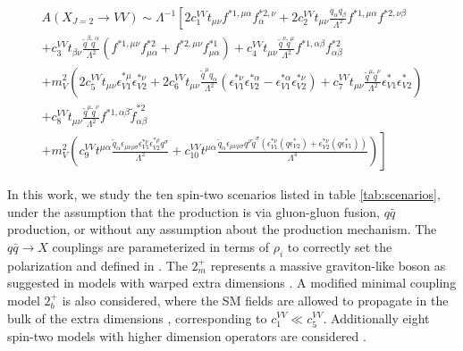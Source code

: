 \begin{multline}
\label{eq:ampl-spin2-a}
A(X_{J=2} \to VV)  \sim \Lambda^{-1} \left [
2 c_{1}^{VV} t_{\mu \nu} f^{*1,\mu \alpha} f^{*2,\nu}_{\alpha}
+ 2 c_{2}^{VV} t_{\mu \nu} \frac{q_\alpha q_\beta }{\Lambda^2} f^{*1,\mu \alpha}  f^{*2,\nu \beta}
\right.   \\
\left.
+ c_{3}^{VV} t_{\beta \nu} \frac{{\tilde q}^\beta {\tilde q}^{\alpha}}{\Lambda^2}
 ( f^{*1,\mu \nu} f^{*2}_{\mu \alpha} + f^{*2,\mu \nu} f^{*1}_{\mu \alpha} )
 + c_{ 4}^{VV}t_{\mu \nu} \frac{{\tilde q}^{\nu} {\tilde q}^\mu}{{\Lambda^2} }  f^{*1,\alpha \beta} f^{*2}_{\alpha \beta}
\right.\\
\left. + m_{V}^2  \left (
2 c_{ 5}^{VV}  t_{\mu\nu} \epsilon_{V1}^{*\mu} \epsilon_{V2}^{*\nu}
+2 c_{ 6}^{VV}  t_{\mu \nu} \frac{{\tilde q}^\mu q_\alpha}{\Lambda^2}
\left ( \epsilon_{V1}^{*\nu} \epsilon_{V2}^{*\alpha} -
\epsilon_{V1}^{*\alpha} \epsilon_{V2}^{*\nu} \right )
+c_{ 7}^{VV} t_{\mu \nu}  \frac{{\tilde q}^\mu {\tilde q}^\nu}{\Lambda^2}  \epsilon^*_{V1} \epsilon^*_{V2}
\right)
\right.  \\
\left.
+c_{ 8}^{VV} t_{\mu \nu} \frac{{\tilde q}^{\mu} {\tilde q}^{\nu}}{\Lambda^2}
  f^{*1,\alpha \beta} {\tilde f}^{*2}_{\alpha \beta}
\right.   \\
 \left.
+  m_{V}^2  \left (
c_{ 9}^{VV} t^{\mu \alpha}
\frac{
{\tilde q}_{\alpha} \epsilon_{\mu \nu \rho \sigma} \epsilon_{V1}^{*\nu} \epsilon_{V2}^{*\rho} q^{\sigma}
}{\Lambda^2}
+c_{ 10}^{VV} t^{\mu \alpha}
\frac{
{\tilde q}_{\alpha} \epsilon_{\mu \nu \rho \sigma} q^\rho {\tilde q}^{\sigma}
\left ( \epsilon_{V1}^{*\nu}(q\epsilon_{V2}^*)+
\epsilon_{V2}^{*\nu}(q\epsilon_{V1}^*) \right )
}{\Lambda^4}
\right )
\right ]
\end{multline}


In this work, we study the ten spin-two scenarios listed in table \ref{tab:scenarios}, under the assumption that the production is via gluon-gluon fusion, $q\bar{q}$ production, or without any assumption about the production mechanism. The $q\bar{q} \to X$ couplings are parameterized in terms of $\rho_{i}$ to correctly set the polarization and defined in \cite{Khachatryan:2014kca}. The $2_m^+$ represents a massive graviton-like boson as suggested in models with warped extra dimensions \cite{Randall:1999vf, Randall:1999ee}. A modified minimal coupling model $2^+_{b}$ is also considered, where the SM fields are allowed to propagate in the bulk of the extra dimensions \cite{Agashe:2007zd}, corresponding to $c_1^{VV} \ll c_5^{VV}$. Additionally eight spin-two models with higher dimension operators are considered \cite{Khachatryan:2014kca}.

